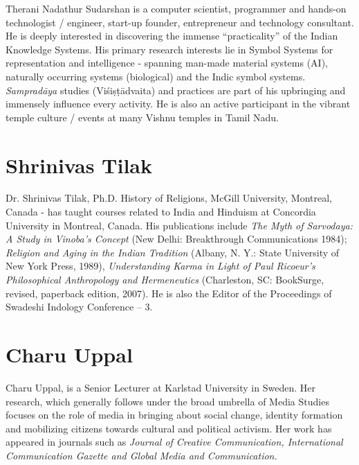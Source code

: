Therani Nadathur Sudarshan is a computer scientist, programmer and hands-on technologist / engineer, start-up founder, entrepreneur and technology consultant. He is deeply interested in discovering the immense “practicality” of the Indian Knowledge Systems. His primary research interests lie in Symbol Systems for representation and intelligence - spanning man-made material systems (AI), naturally occurring systems (biological) and the Indic symbol systems. \textit{Sampradāya} studies (Viśiṣṭādvaita) and practices are part of his upbringing and immensely influence every activity. He is also an active participant in the vibrant temple culture / events at many Vishnu temples in Tamil Nadu.

\section*{Shrinivas Tilak}

Dr. Shrinivas Tilak, Ph.D. History of Religions, McGill University, Montreal, Canada - has taught courses related to India and Hinduism at Concordia University in Montreal, Canada. His publications include \textit{The Myth of Sarvodaya: A Study in Vinoba's Concept} (New Delhi: Breakthrough Communications 1984); \textit{Religion and Aging in the Indian Tradition} (Albany, N. Y.: State University of New York Press, 1989), \textit{Understanding Karma in Light of Paul Ricoeur's Philosophical Anthropology and Hermeneutics} (Charleston, SC: BookSurge, revised, paperback edition, 2007). He is also the Editor of the Proceedings of Swadeshi Indology Conference – 3.

\section*{Charu Uppal}

Charu Uppal, is a Senior Lecturer at Karlstad University in Sweden. Her research, which generally follows under the broad umbrella of Media Studies focuses on the role of media in bringing about social change, identity formation and mobilizing citizens towards cultural and political activism. Her work has appeared in journals such as \textit{Journal of Creative Communication, International Communication Gazette and Global Media and Communication.}

